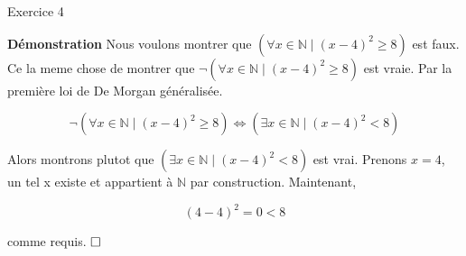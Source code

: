 \documentclass{article}
\begin{document}
Exercice 4

\vspace{0.5cm}

\textbf{Démonstration} Nous voulons montrer que $(\forall x \in \mathbb{N} \mid (x - 4)^2 \geq 8)$ est faux. Ce la meme chose de montrer que $ \neg (\forall x \in \mathbb{N} \mid (x - 4)^2 \geq 8)$ est vraie. Par la première loi de De Morgan généralisée. 

$$ \neg (\forall x \in \mathbb{N} \mid (x - 4)^2 \geq 8) \iff (\exists x \in \mathbb{N} \mid (x - 4)^2 < 8) $$


Alors montrons plutot que $ (\exists x \in \mathbb{N} \mid (x - 4)^2 < 8)$ est vrai. Prenons $x = 4$, un tel x existe et appartient à $\mathbb{N}$ par construction. Maintenant,

$$(4 - 4)^2 = 0 < 8 $$

comme requis.
$\hfill \square$
\end{document}
